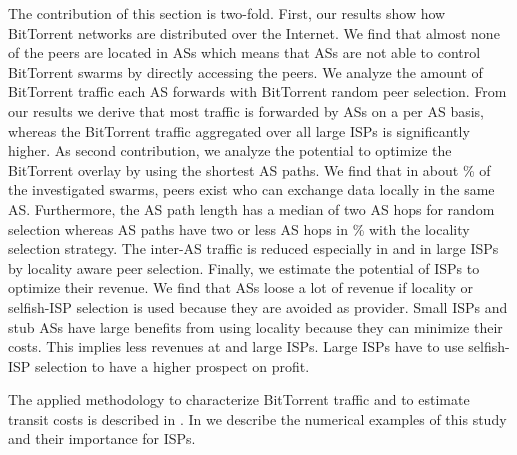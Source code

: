 The contribution of this section is two-fold.
First, our results show how BitTorrent networks are distributed over the Internet. We find that almost none of the peers are located in \tier ASs which means that \tier ASs are not able to control BitTorrent swarms by directly accessing the peers. We analyze the amount of BitTorrent traffic each AS forwards with BitTorrent random peer selection. From our results we derive that most traffic is forwarded by \tier ASs on a per AS basis, whereas the BitTorrent traffic aggregated over all large ISPs is significantly higher. As second contribution, we analyze the potential to optimize the BitTorrent overlay by using the shortest AS paths. We find that in about \unit[15]{\%} of the investigated swarms, peers exist who can exchange data locally in the same AS.
Furthermore, the AS path length has a median of two AS hops for random selection whereas AS paths have two or less AS hops in \unit[80]{\%} with the locality selection strategy. The inter-AS traffic is reduced especially in \tier and in large ISPs by locality aware peer selection. Finally, we estimate the potential of ISPs to optimize their revenue. We find that \tier ASs loose a lot of revenue if locality or selfish-ISP selection is used because they are avoided as provider. Small ISPs and stub ASs have large benefits from using locality because they can minimize their costs. This implies less revenues at \tier and large ISPs. Large ISPs have to use selfish-ISP selection to have a higher prospect on profit.

The applied methodology to characterize BitTorrent traffic and to estimate transit costs is described in . In  we describe the numerical examples of this study and their importance for ISPs.



